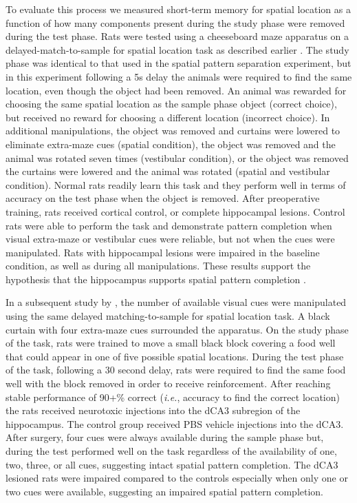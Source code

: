 \documentclass[doc, longtable]{apa6}
\begin{document}
To evaluate this process we measured short-term memory for spatial location as a function of how many components present during the study phase were removed during the test phase. Rats were tested using a cheeseboard maze apparatus on a delayed-match-to-sample for spatial location task as described earlier \parencite{Gilbert1998a}. The study phase was identical to that used in the spatial pattern separation experiment, but in this experiment following a 5s delay the animals were required to find the same location, even though the object had been removed. An animal was rewarded for choosing the same spatial location as the sample phase object (correct choice), but received no reward for choosing a different location (incorrect choice). In additional manipulations, the object was removed and curtains were lowered to eliminate extra-maze cues (spatial condition), the object was removed and the animal was rotated seven times (vestibular condition), or the object was removed the curtains were lowered and the animal was rotated (spatial and vestibular condition). Normal rats readily learn this task and they perform well in terms of accuracy on the test phase when the object is removed. After preoperative training, rats received cortical control, or complete hippocampal lesions. Control rats were able to perform the task and demonstrate pattern completion when visual extra-maze or vestibular cues were reliable, but not when the cues were manipulated. Rats with hippocampal lesions were impaired in the baseline condition, as well as during all manipulations. These results support the hypothesis that the hippocampus supports spatial pattern completion \parencite{Kirwan2005a}. 
 
In a subsequent study by \textcite{Gold2005a}, the number of available visual cues were manipulated using the same delayed matching-to-sample for spatial location task. A black curtain with four extra-maze cues surrounded the apparatus. On the study phase of the task, rats were trained to move a small black block covering a food well that could appear in one of five possible spatial locations. During the test phase of the task, following a 30 second delay, rats were required to find the same food well with the block removed in order to receive reinforcement. After reaching stable performance of 90+\% correct (\textit{i.e.}, accuracy to find the correct location) the rats received neurotoxic injections into the dCA3 subregion of the hippocampus. The control group received PBS vehicle injections into the dCA3. After surgery, four cues were always available during the sample phase but, during the test performed well on the task regardless of the availability of one, two, three, or all cues, suggesting intact spatial pattern completion. The dCA3 lesioned rats were impaired compared to the controls especially when only one or two cues were available, suggesting an impaired spatial pattern completion.
\end{document}
